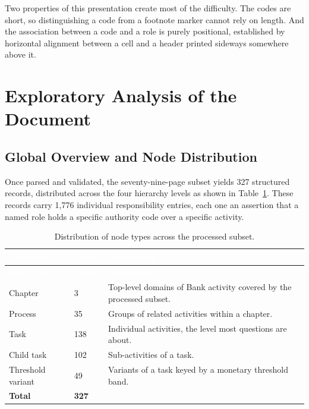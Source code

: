 Two properties of this presentation create most of the difficulty. The codes are short, so distinguishing a code from a footnote marker cannot rely on length. And the association between a code and a role is purely positional, established by horizontal alignment between a cell and a header printed sideways somewhere above it.

\section{Exploratory Analysis of the Document}

\subsection{Global Overview and Node Distribution}

Once parsed and validated, the seventy-nine-page subset yields 327 structured records, distributed across the four hierarchy levels as shown in Table~\ref{tab:nodedist}. These records carry 1,776 individual responsibility entries, each one an assertion that a named role holds a specific authority code over a specific activity.

\begin{longtable}{|p{}|p{}|p{}|}
\caption{Distribution of node types across the processed subset.}\label{tab:nodedist}\\
\hline
\rowcolor{myblue}\textcolor{white}{\textbf{Node type}} & \textcolor{white}{\textbf{Count}} & \textcolor{white}{\textbf{Description}} \\
\hline
\endfirsthead
\hline
\rowcolor{myblue}\textcolor{white}{\textbf{Node type}} & \textcolor{white}{\textbf{Count}} & \textcolor{white}{\textbf{Description}} \\
\hline
\endhead
Chapter & 3 & Top-level domains of Bank activity covered by the processed subset. \\ \hline
Process & 35 & Groups of related activities within a chapter. \\ \hline
Task & 138 & Individual activities, the level most questions are about. \\ \hline
Child task & 102 & Sub-activities of a task. \\ \hline
Threshold variant & 49 & Variants of a task keyed by a monetary threshold band. \\ \hline
\textbf{Total} & \textbf{327} & \\ \hline
\end{longtable}

